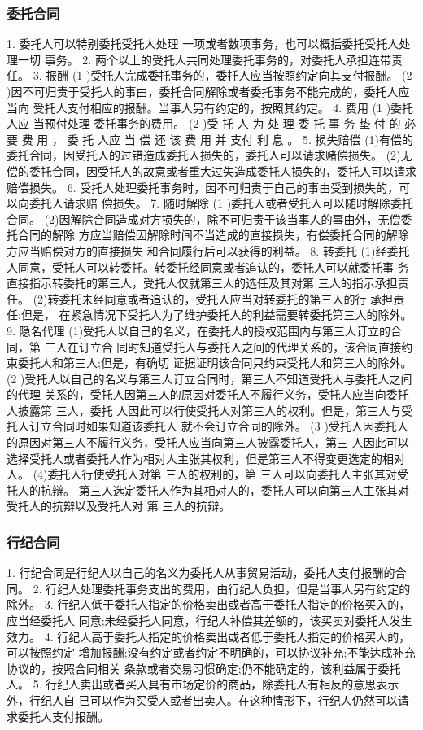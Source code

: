 \documentclass[UTF8,12pt]{ctexart}
\numberwithin{equation}{section} %
\numberwithin{figure}{section}
\numberwithin{table}{section}
\begin{document}
	\subsubsection{委托合同}
	1. 委托人可以特别委托受托人处理 一项或者数项事务，也可以概括委托受托人处理一切 事务。
	2. 两个以上的受托人共同处理委托事务的，对委托人承担连带责任。
	3. 报酬
	(1 )受托人完成委托事务的，委托人应当按照约定向其支付报酬。
	(2 )因不可归责于受托人的事由，委托合同解除或者委托事务不能完成的，委托人应当向 受托人支付相应的报酬。当事人另有约定的，按照其约定。
	4. 费用
	(1 )委托人应 当预付处理 委托事务的费用。
	(2 )受 托 人 为 处 理 委 托 事 务 垫 付 的 必 要 费 用 ， 委 托 人应 当 偿 还 该 费 用 并 支付 利 息 。
	5. 损失赔偿 (1)有偿的委托合同，因受托人的过错造成委托人损失的，委托人可以请求赌偿损失。 (2)无偿的委托合同，因受托人的故意或者重大过失造成委托人损失的，委托人可以请求 赔偿损失。
	6. 受托人处理委托事务时，因不可归责于自己的事由受到损失的，可以向委托人请求赔 偿损失。
	7. 随时解除
	(1 )委托人或者受托人可以随时解除委托合同。 (2)因解除合同造成对方损失的，除不可归责于该当事人的事由外，无偿委托合同的解除 方应当赔偿因解除时间不当造成的直接损失，有偿委托合同的解除方应当赔偿对方的直接损失 和合同履行后可以获得的利益。
	8. 转委托 (1)经委托人同意，受托人可以转委托。转委托经同意或者追认的，委托人可以就委托事 务直接指示转委托的第三人，受托人仅就第三人的选任及其对第 三人的指示承担责任。 (2)转委托未经同意或者追认的，受托人应当对转委托的第三人的行 承担责任;但是， 在紧急情况下受托人为了维护委托人的利益需要转委托第三人的除外。
	9. 隐名代理
	(1)受托人以自己的名义，在委托人的授权范围内与第三人订立的合同，第 三人在订立合 同时知道受托人与委托人之间的代理关系的，该合同直接约束委托人和第三人;但是，有确切 证据证明该合同只约束受托人和第三人的除外。
	(2 )受托人以自己的名义与第三人订立合同时，第三人不知道受托人与委托人之间的代理 关系的，受托人因第三人的原因对委托人不履行义务，受托人应当向委托人披露第 三人，委托 人因此可以行使受托人对第三人的权利。但是，第三人与受托人订立合同时如果知道该委托人 就不会订立合同的除外。
	(3 )受托人因委托人的原因对第三人不履行义务，受托人应当向第三人披露委托人，第三 人因此可以选择受托人或者委托人作为相对人主张其权利，但是第三人不得变更选定的相对人。 (4)委托人行使受托人对第 三人的权利的，第 三人可以向委托人主张其对受托人的抗辩。 第三人选定委托人作为其相对人的，委托人可以向第三人主张其对受托人的抗辩以及受托人对 第 三人的抗辩。
	
	\subsubsection{行纪合同}
	1. 行纪合同是行纪人以自己的名义为委托人从事贸易活动，委托人支付报酬的合同。
	2. 行纪人处理委托事务支出的费用，由行纪人负担，但是当事人另有约定的除外。
	3. 行纪人低于委托人指定的价格卖出或者高于委托人指定的价格买入的，应当经委托人 同意;未经委托人同意，行纪人补偿其差额的，该买卖对委托人发生效力。
	4. 行纪人高于委托人指定的价格卖出或者低于委托人指定的价格买人的，可以按照约定 增加报酬;没有约定或者约定不明确的，可以协议补充;不能达成补充协议的，按照合同相关 条款或者交易习惯确定;仍不能确定的，该利益属于委托人。
	5. 行纪人卖出或者买入具有市场定价的商品，除委托人有相反的意思表示外，行纪人自 已可以作为买受人或者出卖人。在这种情形下，行纪人仍然可以请求委托人支付报酬。
	 
\end{document}
